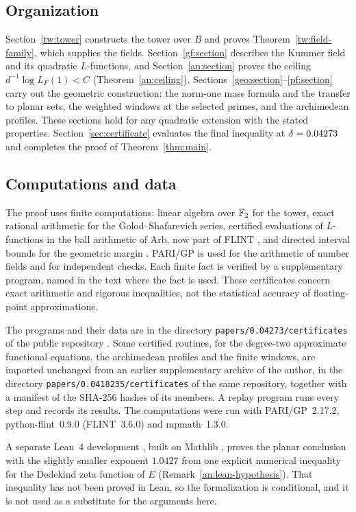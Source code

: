 \subsection{Organization}\label{intro:organization}
Section~\ref{tw:tower} constructs the tower over $B$ and proves
Theorem~\ref{tw:field-family}, which supplies the fields.
Section~\ref{gf:section} describes the Kummer field and its quadratic
$L$-functions, and Section~\ref{an:section} proves the ceiling
$d^{-1}\log L_F(1)<C$ (Theorem~\ref{an:ceiling}).
Sections~\ref{geo:section}--\ref{pf:section} carry out the geometric
construction: the norm-one mass formula and the transfer to planar sets,
the weighted windows at the selected primes, and the archimedean
profiles. These sections hold for any quadratic extension with the
stated properties. Section~\ref{sec:certificate} evaluates the final
inequality at $\delta=0.04273$ and completes the proof of
Theorem~\ref{thm:main}.

\subsection{Computations and data}\label{intro:code}
The proof uses finite computations: linear algebra over $\mathbb F_2$ for the
tower, exact rational arithmetic for the Golod--Shafarevich series,
certified evaluations of $L$-functions in the ball arithmetic of Arb,
now part of FLINT \cite{Johansson2017,FLINT}, and directed interval
bounds for the geometric margin \cite{Mpmath}. PARI/GP \cite{PARI} is
used for the arithmetic of number fields and for independent checks.
Each finite fact is verified by a supplementary program, named in the
text where the fact is used. These certificates concern exact arithmetic
and rigorous inequalities, not the statistical accuracy of
floating-point approximations.

The programs and their data are in the directory
\texttt{papers/0.04273/certificates} of the public repository
\cite{NaslundCode2026}. Some certified routines, for the degree-two
approximate functional equations, the archimedean profiles and the
finite windows, are imported unchanged from an earlier supplementary
archive of the author, in the directory
\texttt{papers/0.0418235/certificates} of the same repository, together
with a manifest of the SHA-256 hashes of its members. A replay program
runs every step and records its results. The computations were run with
PARI/GP~2.17.2, python-flint~0.9.0 (FLINT~3.6.0) and mpmath~1.3.0.

A separate Lean~4 development \cite{NaslundLean2026}, built on Mathlib
\cite{Lean4_2021,Mathlib2020}, proves the planar conclusion with the
slightly smaller exponent $1.0427$ from one explicit numerical inequality
for the Dedekind zeta function of $E$
(Remark~\ref{an:lean-hypothesis}). That inequality has not been proved in
Lean, so the formalization is conditional, and it is not used as a
substitute for the arguments here.
